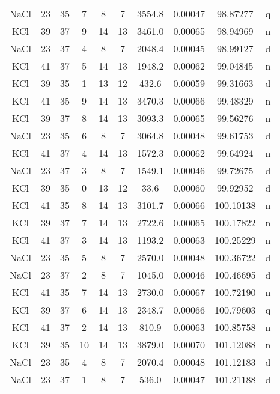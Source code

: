 \begin{table*}[htp]
\begin{tabular}{cccccccccc}
NaCl & 23 & 35 & 7 & 8 & 7 & 3554.8 & 0.00047 & 98.87277 & q \\
KCl & 39 & 37 & 9 & 14 & 13 & 3461.0 & 0.00065 & 98.94969 & n \\
NaCl & 23 & 37 & 4 & 8 & 7 & 2048.4 & 0.00045 & 98.99127 & d \\
KCl & 41 & 37 & 5 & 14 & 13 & 1948.2 & 0.00062 & 99.04845 & n \\
KCl & 39 & 35 & 1 & 13 & 12 & 432.6 & 0.00059 & 99.31663 & d \\
KCl & 41 & 35 & 9 & 14 & 13 & 3470.3 & 0.00066 & 99.48329 & n \\
KCl & 39 & 37 & 8 & 14 & 13 & 3093.3 & 0.00065 & 99.56276 & n \\
NaCl & 23 & 35 & 6 & 8 & 7 & 3064.8 & 0.00048 & 99.61753 & d \\
KCl & 41 & 37 & 4 & 14 & 13 & 1572.3 & 0.00062 & 99.64924 & n \\
NaCl & 23 & 37 & 3 & 8 & 7 & 1549.1 & 0.00046 & 99.72675 & d \\
KCl & 39 & 35 & 0 & 13 & 12 & 33.6 & 0.00060 & 99.92952 & d \\
KCl & 41 & 35 & 8 & 14 & 13 & 3101.7 & 0.00066 & 100.10138 & n \\
KCl & 39 & 37 & 7 & 14 & 13 & 2722.6 & 0.00065 & 100.17822 & n \\
KCl & 41 & 37 & 3 & 14 & 13 & 1193.2 & 0.00063 & 100.25229 & n \\
NaCl & 23 & 35 & 5 & 8 & 7 & 2570.0 & 0.00048 & 100.36722 & d \\
NaCl & 23 & 37 & 2 & 8 & 7 & 1045.0 & 0.00046 & 100.46695 & d \\
KCl & 41 & 35 & 7 & 14 & 13 & 2730.0 & 0.00067 & 100.72190 & n \\
KCl & 39 & 37 & 6 & 14 & 13 & 2348.7 & 0.00066 & 100.79603 & q \\
KCl & 41 & 37 & 2 & 14 & 13 & 810.9 & 0.00063 & 100.85758 & n \\
KCl & 39 & 35 & 10 & 14 & 13 & 3879.0 & 0.00070 & 101.12088 & n \\
NaCl & 23 & 35 & 4 & 8 & 7 & 2070.4 & 0.00048 & 101.12183 & d \\
NaCl & 23 & 37 & 1 & 8 & 7 & 536.0 & 0.00047 & 101.21188 & d \\
\hline
\end{tabular}

\par 
\end{table*}
